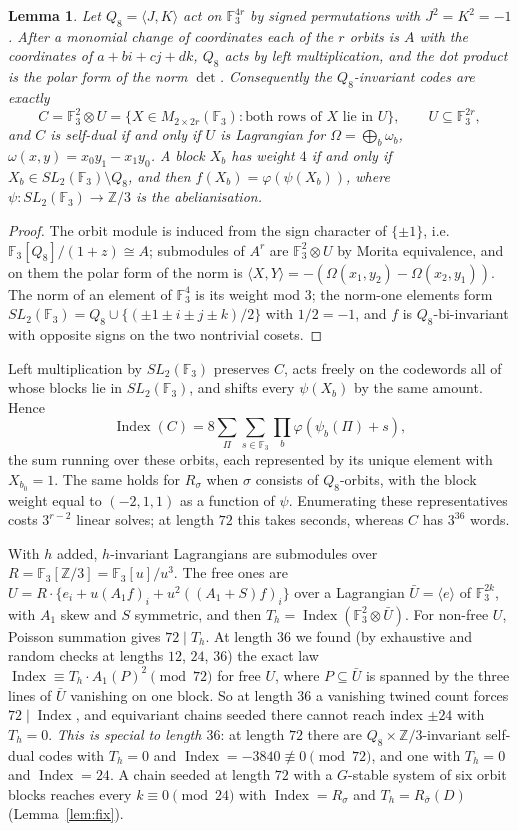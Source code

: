 \documentclass[11pt]{amsart}
\newtheorem{lemma}[theorem]{Lemma}
\theoremstyle{definition}
\newcommand{\F}{\mathbb{F}_3}
\newcommand{\Index}{\operatorname{Index}}
\begin{document}
\begin{lemma}\label{lem:morita}
Let $Q_8=\langle J,K\rangle$ act on $\F^{4r}$ by signed permutations with $J^2=K^2=-1$. After a
monomial change of coordinates each of the $r$ orbits is $A$ with the coordinates of $a+bi+cj+dk$,
$Q_8$ acts by left multiplication, and the dot product is the polar form of the norm $\det$.
Consequently the $Q_8$-invariant codes are exactly
\[
C=\F^2\otimes U=\{X\in M_{2\times 2r}(\F):\text{both rows of }X\text{ lie in }U\},\qquad U\subseteq\F^{2r},
\]
and $C$ is self-dual if and only if $U$ is Lagrangian for $\Omega=\bigoplus_b\omega_b$,
$\omega(x,y)=x_0y_1-x_1y_0$. A block $X_b$ has weight $4$ if and only if $X_b\in SL_2(\F)\setminus Q_8$, and
then $f(X_b)=\varphi(\psi(X_b))$, where $\psi\colon SL_2(\F)\to\mathbb Z/3$ is the abelianisation.
\end{lemma}

\begin{proof}
The orbit module is induced from the sign character of $\{\pm1\}$, i.e.\ $\F[Q_8]/(1+z)\cong A$;
submodules of $A^r$ are $\F^2\otimes U$ by Morita equivalence, and on them the polar form of the
norm is $\langle X,Y\rangle=-(\Omega(x_1,y_2)-\Omega(x_2,y_1))$. The norm of an element of $\F^4$ is
its weight mod $3$; the norm-one elements form $SL_2(\F)=Q_8\cup\{(\pm1\pm i\pm j\pm k)/2\}$ with
$1/2=-1$, and $f$ is $Q_8$-bi-invariant with opposite signs on the two nontrivial cosets.
\end{proof}

Left multiplication by $SL_2(\F)$ preserves $C$, acts freely on the codewords all of whose blocks
lie in $SL_2(\F)$, and shifts every $\psi(X_b)$ by the same amount. Hence
\[
\Index(C)=8\sum_\Pi\sum_{s\in\F}\prod_b\varphi(\psi_b(\Pi)+s),
\]
the sum running over these orbits, each represented by its unique element with $X_{b_0}=1$. The same holds for $R_\sigma$ when $\sigma$ consists of
$Q_8$-orbits, with the block weight equal to $(-2,1,1)$ as a function of $\psi$. Enumerating these
representatives costs $3^{r-2}$ linear solves; at length $72$ this takes seconds, whereas $C$ has $3^{36}$ words.

With $h$ added, $h$-invariant Lagrangians are submodules over $R=\F[\mathbb Z/3]=\F[u]/u^3$. The free
ones are $U=R\cdot\{e_i+u(A_1f)_i+u^2((A_1+S)f)_i\}$ over a Lagrangian $\bar U=\langle e\rangle$ of
$\F^{2k}$, with $A_1$ skew and $S$ symmetric, and then $T_h=\Index(\F^2\otimes\bar U)$. For non-free $U$,
Poisson summation gives $72\mid T_h$. At length $36$ we found (by exhaustive and random checks at lengths $12$,
$24$, $36$) the exact law $\Index\equiv T_h\cdot A_1(P)^2\pmod{72}$ for free $U$, where $P\subseteq\bar U$
is spanned by the three lines of $\bar U$ vanishing on one block. So at length $36$ a vanishing twined
count forces $72\mid\Index$, and equivariant chains seeded there cannot reach index $\pm24$ with $T_h=0$.
\emph{This is special to length $36$}: at length $72$ there are $Q_8\times\mathbb Z/3$-invariant self-dual
codes with $T_h=0$ and $\Index=-3840\not\equiv0\pmod{72}$, and one with $T_h=0$ and $\Index=24$. A chain
seeded at length $72$ with a $G$-stable system of six orbit blocks reaches every $k\equiv0\pmod{24}$ with
$\Index=R_\sigma$ and $T_h=R_{\bar\sigma}(D)$ (Lemma~\ref{lem:fix}).
\end{document}
